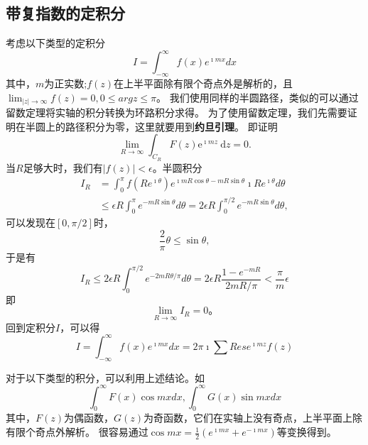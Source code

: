  \subsection{带复指数的定积分}
 考虑以下类型的定积分
 \begin{equation}
    I=\int_{-\infty}^{\infty} f(x) e^{\imath m x} d x
\end{equation}
其中，$m$为正实数;$f(z)$在上半平面除有限个奇点外是解析的，且$\lim_{|z|\to \infty} f(z) = 0, 0 \leq arg z \leq \pi$。
我们使用同样的半圆路径，类似的可以通过留数定理将实轴的积分转换为环路积分求得。
为了使用留数定理，我们先需要证明在半圆上的路径积分为零，这里就要用到\textbf{约旦引理}。
即证明
\begin{equation}
    \lim _{R \rightarrow \infty} \int_{C_R} F(z) \mathrm{e}^{\imath m z} \mathrm{~d} z=0 .
\end{equation}
当$R$足够大时，我们有$|f(z)| < \epsilon$。半圆积分
\begin{align}
    I_R&=\int_0^\pi f\left(R e^{\imath \theta}\right) 
    e^{\imath m R \cos \theta- m R \sin \theta} \imath R e^{\imath \theta} d \theta
    \\
    &\leq \epsilon R \int_0^\pi e^{-m R \sin \theta} d \theta=2 \epsilon R \int_0^{\pi / 2} e^{-m R \sin \theta} d \theta,
\end{align}
可以发现在$\left[ 0, \pi/2\right]$时，
\begin{equation}
    \frac{2}{\pi}\theta \leq \sin{\theta},
\end{equation}
于是有
\begin{equation}
    I_R \leq 2 \epsilon R \int_0^{\pi / 2} e^{-2 m R \theta / \pi} d \theta=2 \epsilon R \frac{1-e^{-m R}}{2 m R / \pi}<\frac{\pi}{m} \epsilon
\end{equation}
即
\begin{equation}
    \lim_{R\to \infty} I_R = 0\textrm{。}
\end{equation}
回到定积分$I$，可以得
\begin{equation}
    I=\int_{-\infty}^{\infty} f(x) e^{ \imath m x} d x = 2\pi \imath \sum Res e^{\imath m z} f(z)
\end{equation}

对于以下类型的积分，可以利用上述结论。如
\begin{equation}
    \int_{0}^{\infty} F(x) \cos {m x} dx, \int_{0}^{\infty} G(x) \sin{m x} dx
\end{equation}
其中，$F(z)$为偶函数，$G(z)$为奇函数，它们在实轴上没有奇点，上半平面上除有限个奇点外解析。
很容易通过$\cos{mx} = \frac{1}{2}\left( e^{\imath m x} + e^{-\imath mx}\right)$等变换得到。